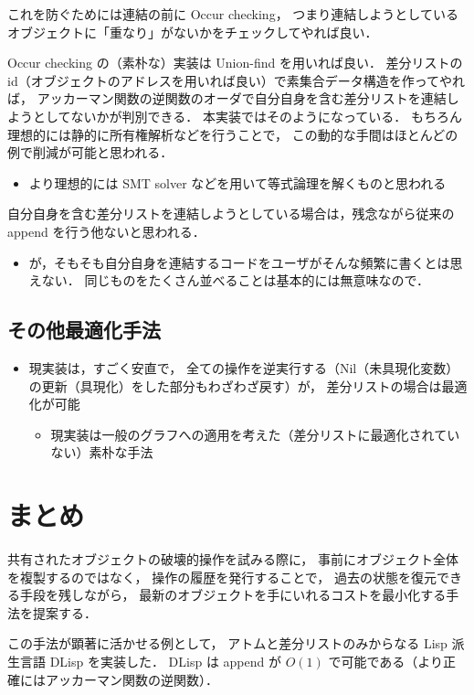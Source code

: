 \documentclass[10pt, a4j, twocolumn]{scrartcl}
\begin{document}
これを防ぐためには連結の前に Occur checking，
つまり連結しようとしているオブジェクトに「重なり」がないかをチェックしてやれば良い．

Occur checking の（素朴な）実装は Union-find を用いれば良い．
差分リストの id（オブジェクトのアドレスを用いれば良い）で素集合データ構造を作ってやれば，
アッカーマン関数の逆関数のオーダで自分自身を含む差分リストを連結しようとしてないかが判別できる．
本実装ではそのようになっている．
もちろん理想的には静的に所有権解析などを行うことで，
この動的な手間はほとんどの例で削減が可能と思われる．
\begin{itemize}
\item より理想的には SMT solver などを用いて等式論理を解くものと思われる
\end{itemize}

自分自身を含む差分リストを連結しようとしている場合は，残念ながら従来の append を行う他ないと思われる．
\begin{itemize}
\item が，そもそも自分自身を連結するコードをユーザがそんな頻繁に書くとは思えない．
同じものをたくさん並べることは基本的には無意味なので．
\end{itemize}


\subsection{その他最適化手法}
\label{sec:orgdce1487}
\begin{itemize}
\item 現実装は，すごく安直で，
全ての操作を逆実行する（Nil（未具現化変数）の更新（具現化）をした部分もわざわざ戻す）が，
差分リストの場合は最適化が可能
\begin{itemize}
\item 現実装は一般のグラフへの適用を考えた（差分リストに最適化されていない）素朴な手法
\end{itemize}
\end{itemize}


\section{まとめ}
\label{sec:org42fc826}

共有されたオブジェクトの破壊的操作を試みる際に，
事前にオブジェクト全体を複製するのではなく，
操作の履歴を発行することで，
過去の状態を復元できる手段を残しながら，
最新のオブジェクトを手にいれるコストを最小化する手法を提案する．

この手法が顕著に活かせる例として，
アトムと差分リストのみからなる Lisp 派生言語 DLisp を実装した．
DLisp は append が \(O(1)\) で可能である（より正確にはアッカーマン関数の逆関数）．
\end{document}
